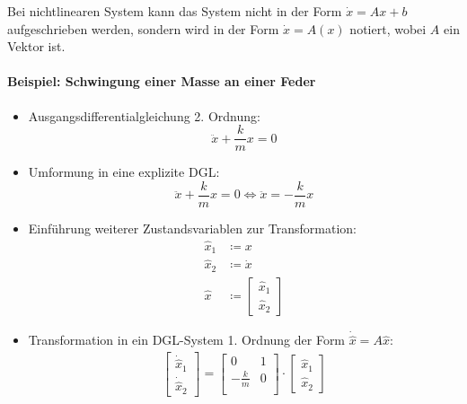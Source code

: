 			Bei nichtlinearen System kann das System nicht in der Form \( \dot{x} = Ax + b \) aufgeschrieben werden, sondern wird in der Form \( \dot{x} = A(x) \) notiert, wobei \( A \) ein Vektor ist.

			\paragraph{Beispiel: Schwingung einer Masse an einer Feder}
				\begin{itemize}
					\item Ausgangsdifferentialgleichung 2. Ordnung:
						\begin{equation*}
							\ddot{x} + \frac{k}{m} x = 0
						\end{equation*}
					\item Umformung in eine explizite DGL:
						\begin{equation*}
							\ddot{x} + \frac{k}{m} x = 0 \iff \ddot{x} = - \frac{k}{m} x
						\end{equation*}
					\item Einführung weiterer Zustandsvariablen zur Transformation:
						\begin{align*}
							\hat{x} _ 1 & \coloneqq x       \\
							\hat{x} _ 2 & \coloneqq \dot{x} \\
							\hat{x}     & \coloneqq
							\begin{bmatrix}
								\hat{x} _ 1 \\
								\hat{x} _ 2
							\end{bmatrix}
						\end{align*}
					\item Transformation in ein DGL-System 1. Ordnung der Form \( \dot{\hat{x}} = A\hat{x} \):
						\begin{align*}
							\begin{bmatrix}
								\dot{\hat{x}} _ 1 \\
								\dot{\hat{x}} _ 2
							\end{bmatrix}
							=
							\begin{bmatrix}
								0            & 1 \\
								-\frac{k}{m} & 0 \\
							\end{bmatrix}
							\cdot
							\begin{bmatrix}
								\hat{x} _ 1 \\
								\hat{x} _ 2
							\end{bmatrix}
						\end{align*}
				\end{itemize}

